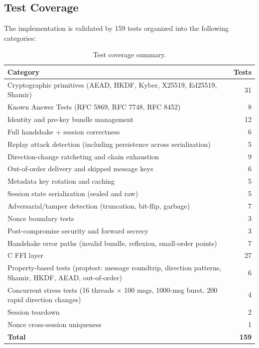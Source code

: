 \documentclass[11pt,a4paper]{article}
\theoremstyle{definition}
\begin{document}
\subsection{Test Coverage}\label{sec:tests}

The implementation is validated by 159 tests organized into the following categories:

\begin{table}[H]
\centering
\caption{Test coverage summary.}\label{tab:tests}
\small
\begin{tabular}{@{}lr@{}}
\toprule
Category & Tests \\
\midrule
Cryptographic primitives (AEAD, HKDF, Kyber, X25519, Ed25519, Shamir) & 31 \\
Known Answer Tests (RFC 5869, RFC 7748, RFC 8452) & 8 \\
Identity and pre-key bundle management & 12 \\
Full handshake + session correctness & 6 \\
Replay attack detection (including persistence across serialization) & 5 \\
Direction-change ratcheting and chain exhaustion & 9 \\
Out-of-order delivery and skipped message keys & 6 \\
Metadata key rotation and caching & 5 \\
Session state serialization (sealed and raw) & 5 \\
Adversarial/tamper detection (truncation, bit-flip, garbage) & 7 \\
Nonce boundary tests & 3 \\
Post-compromise security and forward secrecy & 3 \\
Handshake error paths (invalid bundle, reflexion, small-order points) & 7 \\
C FFI layer & 27 \\
Property-based tests (proptest: message roundtrip, direction patterns, Shamir, HKDF, AEAD, out-of-order) & 6 \\
Concurrent stress tests (16 threads $\times$ 100 msgs, 1000-msg burst, 200 rapid direction changes) & 4 \\
Session teardown & 2 \\
Nonce cross-session uniqueness & 1 \\
\midrule
\textbf{Total} & \textbf{159} \\
\bottomrule
\end{tabular}
\end{table}
\end{document}
